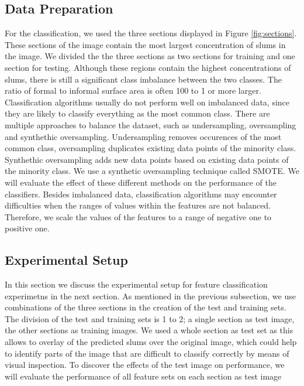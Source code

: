\subsection{Data Preparation}

For the classification, we used the three sections displayed in Figure \ref{fig:sections}. These sections of the image contain the most largest concentration of slums in the image. We divided the the three sections as two sections for training and one section for testing. Although these regions contain the highest concentrations of slums, there is still a significant class imbalance between the two classes. The ratio of formal to informal surface area is often 100 to 1 or more larger. Classification algorithms usually do not perform well on imbalanced data, since they are likely to classify everything as the most common class. There are multiple approaches to balance the dataset, such as undersampling, oversampling and synthethic oversampling. Undersampling removes occurences of the most common class, oversampling duplicates existing data points of the minority class. Synthethic oversampling adds new data points based on existing data points of the minority class. We use a synthetic oversampling technique called SMOTE. We will evaluate the effect of these different methods on the performance of the classifiers. Besides imbalanced data, classification algorithms may encounter difficulties when the ranges of values within the features are not balanced. Therefore, we scale the values of the features to a range of negative one to positive one.

\subsection{Experimental Setup}

In this section we discuss the experimental setup for feature classification experimetns in the next section. As mentioned in the previous subsection, we use combinations of the three sections in the creation of the test and training sets. The division of the test and training sets is 1 to 2; a single section as test image, the other sections as training images. We used a whole section as test set as this allows to overlay of the predicted slums over the original image, which could help to identify parts of the image that are difficult to classify correctly by means of visual inspection. To discover the effects of the test image on performance, we will evaluate the performance of all feature sets on each section as test image

